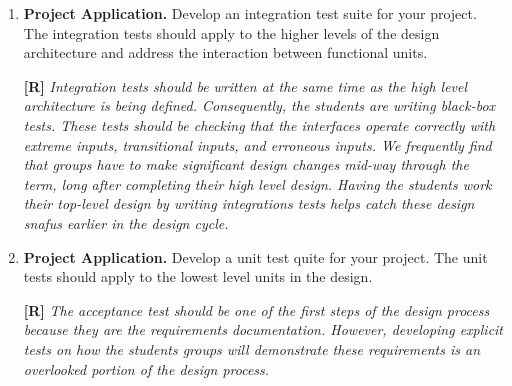\begin{enumerate}
\item
  \textbf{Project Application.} Develop an integration test suite for
  your project. The integration tests should apply to the higher levels
  of the design architecture and address the interaction between
  functional units.

  \begin{onlysolution}
    \textbf{[R]}
    \itshape
    Integration tests should be written at the same time as the high level architecture is being 
    defined. Consequently, the students are writing black-box tests. These tests should be checking 
    that the interfaces operate correctly with extreme inputs, transitional inputs, and erroneous inputs. 
    We frequently find that groups have to make significant design changes mid-way through the term, long 
    after completing their high level design. Having the students work their top-level design by writing 
    integrations tests helps catch these design snafus earlier in the design cycle.
  \end{onlysolution}

\item
  \textbf{Project Application.} Develop a unit test quite for your
  project. The unit tests should apply to the lowest level units in the
  design.

  \begin{onlysolution}
    \textbf{[R]}
    \itshape
    The acceptance test should be one of the first steps of the design process because they are the requirements 
    documentation. However, developing explicit tests on how the students groups will demonstrate these requirements 
    is an overlooked portion of the design process.
  \end{onlysolution}

\end{enumerate}
